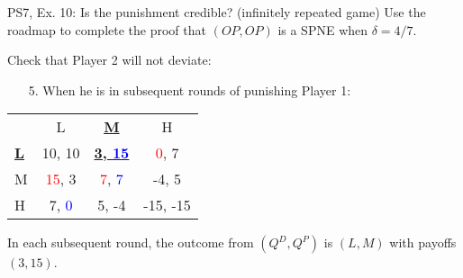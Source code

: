 \begin{frame}{PS7, Ex. 10: Is the punishment credible? (infinitely repeated game)}
  Use the roadmap to complete the proof that $(OP,OP)$ is a SPNE when $\delta=4/7$.\vspace{-4pt}
  \begin{multicols}{2}
    Check that Player 2 will not deviate:
    \begin{itemize}
      \item[5.] When he is in subsequent rounds of punishing Player 1:
    \end{itemize}
    \vfill\null\columnbreak
    \vspace{-6pt}
    \begin{table}
      \begin{tabular}{l|c|c|c|}
        \multicolumn{1}{c}{} & \multicolumn{1}{c}{L} & \multicolumn{1}{c}{\textbf{\underline{M}}} & \multicolumn{1}{c}{H} \\\cline{2-4}
        \textbf{\underline{L}} & 10, 10 & \textbf{\underline{3, \textcolor{blue}{15}}} & \textcolor{red}{0}, 7 \\\cline{2-4}
        M & \textcolor{red}{15}, 3 & \textcolor{red}{7}, \textcolor{blue}{7} & -4, 5 \\\cline{2-4}
        H & 7, \textcolor{blue}{0} & 5, -4 & -15, -15 \\\cline{2-4}
      \end{tabular}
    \end{table}
    \vspace{-8pt}
  \end{multicols}
    In each subsequent round, the outcome from $(Q^D,Q^P)$ is $(L,M)$ with payoffs $(3,15)$.\\\medskip
    \vfill\null
\end{frame}

